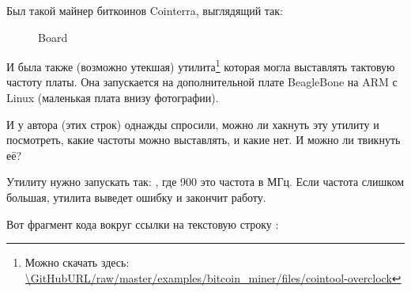 
Был такой майнер биткоинов Cointerra, выглядящий так:

\begin{figure}[H]
\centering
{}
\caption{Board}
\end{figure}

И была также (возможно утекшая) утилита\footnote{Можно скачать здесь: \url{\GitHubURL/raw/master/examples/bitcoin_miner/files/cointool-overclock}}
которая могла выставлять тактовую частоту платы.
Она запускается на дополнительной плате BeagleBone на ARM с Linux (маленькая плата внизу фотографии).

И у автора (этих строк) однажды спросили, можно ли хакнуть эту утилиту и посмотреть, какие частоты можно выставлять, и какие нет.
И можно ли твикнуть её?

Утилиту нужно запускать так: , где 900 это частота в МГц.
Если частота слишком большая, утилита выведет ошибку  и закончит работу.

Вот фрагмент кода вокруг ссылки на текстовую строку :

